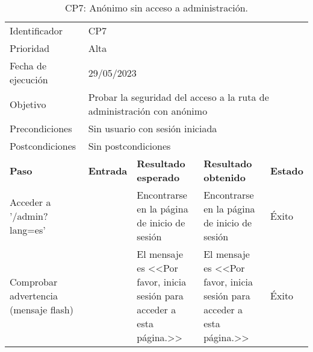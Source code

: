 \begin{table}[H]
\begin{tabular}{p{}p{}p{}p{}p{}}
\rowcolor{gray!25}
Identificador   & \multicolumn{4}{l}{CP7}                                                   \\
Prioridad   & \multicolumn{4}{l}{Alta}                                                    \\
\rowcolor{gray!25}
Fecha de ejecución   & \multicolumn{4}{l}{29/05/2023}                                                    \\
Objetivo        & \multicolumn{4}{p{0.80\textwidth}}{Probar la seguridad del acceso a la ruta de administración con anónimo}                                                     \\
\rowcolor{gray!25}
Precondiciones  & \multicolumn{4}{l}{Sin usuario con sesión iniciada}                                                     \\
Postcondiciones & \multicolumn{4}{l}{Sin postcondiciones}                                                     \\ \hline
\rowcolor{gray!25}
\textbf{Paso}   & \textbf{Entrada} & \textbf{Resultado esperado} & \textbf{Resultado obtenido} & \textbf{Estado} \\ \hline
Acceder a '/admin?lang=es'                         &                        & Encontrarse en la página de inicio de sesión                                 & Encontrarse en la página de inicio de sesión                                     & Éxito  \\ \hline
Comprobar advertencia (mensaje flash)      &                        & El mensaje es <<Por favor, inicia sesión para acceder a esta página.>>                               & El mensaje es <<Por favor, inicia sesión para acceder a esta página.>>                                 & Éxito  \\ \hline 
\end{tabular}
\caption{CP7: Anónimo sin acceso a administración.}
\end{table}

